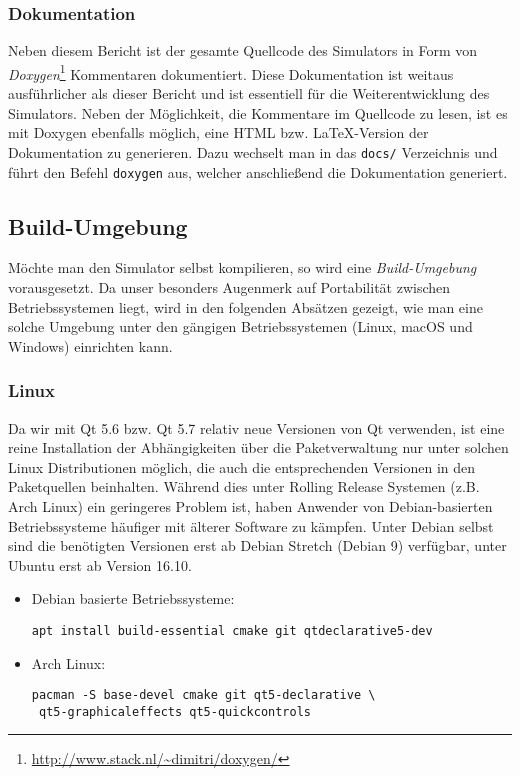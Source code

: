 \subsubsection{Dokumentation}

Neben diesem Bericht ist der gesamte Quellcode des Simulators in Form von
\emph{Doxygen}\footnote{\url{http://www.stack.nl/~dimitri/doxygen/}} Kommentaren
dokumentiert. Diese Dokumentation ist weitaus ausführlicher als dieser Bericht
und ist essentiell für die Weiterentwicklung des Simulators. Neben der
Möglichkeit, die Kommentare im Quellcode zu lesen, ist es mit Doxygen ebenfalls
möglich, eine HTML bzw. \LaTeX -Version der Dokumentation zu generieren. Dazu
wechselt man in das \texttt{docs/} Verzeichnis und führt den Befehl
\texttt{doxygen} aus, welcher anschließend die Dokumentation generiert.

\subsection{Build-Umgebung}

Möchte man den Simulator selbst kompilieren, so wird eine \emph{Build-Umgebung}
vorausgesetzt. Da unser besonders Augenmerk auf Portabilität zwischen
Betriebssystemen liegt, wird in den folgenden Absätzen gezeigt, wie man eine
solche Umgebung unter den gängigen Betriebssystemen (Linux, macOS und Windows)
einrichten kann.

\subsubsection{Linux}

Da wir mit Qt 5.6 bzw. Qt 5.7 relativ neue Versionen von Qt verwenden, ist eine
reine Installation der Abhängigkeiten über die Paketverwaltung nur unter solchen
Linux Distributionen möglich, die auch die entsprechenden Versionen in den
Paketquellen beinhalten. Während dies unter Rolling Release Systemen (z.B. Arch
Linux) ein geringeres Problem ist, haben Anwender von Debian-basierten
Betriebssysteme häufiger mit älterer Software zu kämpfen. Unter Debian selbst
sind die benötigten Versionen erst ab Debian Stretch (Debian 9) verfügbar, unter
Ubuntu erst ab Version 16.10.

\begin{itemize}
	\item Debian basierte Betriebssysteme: 
	\begin{lstlisting}
apt install build-essential cmake git qtdeclarative5-dev
	\end{lstlisting}

	\item Arch Linux: 
	\begin{lstlisting}
pacman -S base-devel cmake git qt5-declarative \
 qt5-graphicaleffects qt5-quickcontrols
	\end{lstlisting}
\end{itemize}

